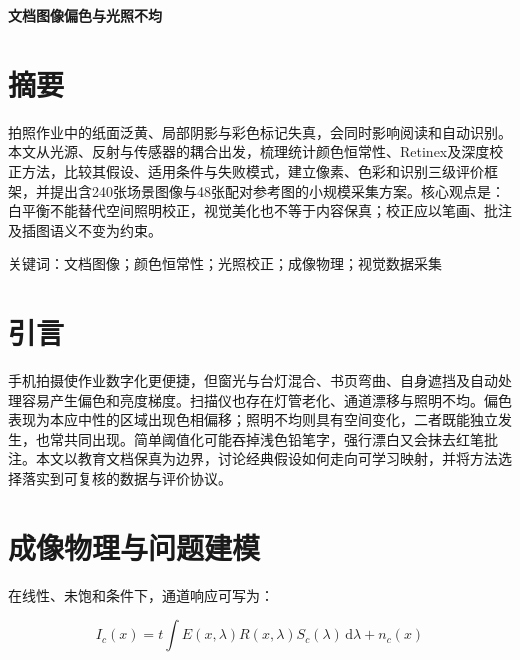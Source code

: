 \documentclass[UTF8,a4paper,zihao=5,fontset=none]{ctexart}
\begin{document}
\begin{center}

{\bfseries 文档图像偏色与光照不均\par}



\end{center}

\section*{摘要}

拍照作业中的纸面泛黄、局部阴影与彩色标记失真，会同时影响阅读和自动识别。本文从光源、反射与传感器的耦合出发，梳理统计颜色恒常性、Retinex及深度校正方法，比较其假设、适用条件与失败模式，建立像素、色彩和识别三级评价框架，并提出含240张场景图像与48张配对参考图的小规模采集方案。核心观点是：白平衡不能替代空间照明校正，视觉美化也不等于内容保真；校正应以笔画、批注及插图语义不变为约束。


关键词：文档图像；颜色恒常性；光照校正；成像物理；视觉数据采集


\section{引言}

手机拍摄使作业数字化更便捷，但窗光与台灯混合、书页弯曲、自身遮挡及自动处理容易产生偏色和亮度梯度。扫描仪也存在灯管老化、通道漂移与照明不均。偏色表现为本应中性的区域出现色相偏移；照明不均则具有空间变化，二者既能独立发生，也常共同出现。简单阈值化可能吞掉浅色铅笔字，强行漂白又会抹去红笔批注。本文以教育文档保真为边界，讨论经典假设如何走向可学习映射，并将方法选择落实到可复核的数据与评价协议。


\section{成像物理与问题建模}

在线性、未饱和条件下，通道响应可写为：


\begin{equation}
I_c(x)=t\int E(x,\lambda)R(x,\lambda)S_c(\lambda)\,\mathrm{d}\lambda+n_c(x)
\label{eq:1}
\end{equation}
\end{document}
